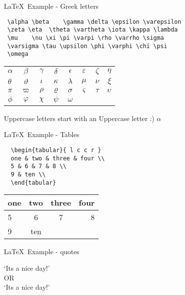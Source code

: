 \begin{frame}[t,fragile]{\LaTeX\ Example - Greek letters}

  \begin{lstlisting}
 \alpha \beta	 \gamma \delta \epsilon \varepsilon
 \zeta \eta	 \theta \vartheta \iota \kappa \lambda
 \mu	\nu \xi \pi \varpi \rho \varrho \sigma
 \varsigma \tau \upsilon \phi \varphi \chi \psi
 \omega
  \end{lstlisting}

\begin{tabular}{ l c c c c c c r }
  $\alpha$ & $\beta$ & $\gamma$ & $\delta$ & $\epsilon$ & $\varepsilon$ & $\zeta$ & $\eta$ \\
  $\theta$ & $\vartheta$ & $\iota$ & $\kappa$ & $\lambda$ & $\mu$ & $\nu$ & $\xi$ \\
  $\pi$ & $\varpi$ & $\rho$ & $\varrho$ & $\sigma$ & $\varsigma$ & $\tau$ & $\upsilon$ \\
  $\phi$ & $\varphi$ & $\chi$ & $\psi$ & $\omega$ \\
\end{tabular}

Uppercase letters start with an Uppercase letter :) $\alpha$

\end{frame}

\begin{frame}[t,fragile]{\LaTeX\ Example - Tables}


\begin{lstlisting}
  \begin{tabular}{ l c c r }
  one & two & three & four \\
  5 & 6 & 7 & 8 \\
  9 & ten \\
  \end{tabular}
\end{lstlisting}

\begin{tabular}{ l | c || c r }
one & two & three & four \\ \hline
5 & 6 & 7 & 8 \\
9 & ten \\
\end{tabular}
\end{frame}

\begin{frame}[t,fragile]{\LaTeX\ Example - quotes}

  `It\textquotesingle s a nice day!' \\
  OR \\
  `It{\textquotesingle}s a nice day!' \\

\end{frame}

